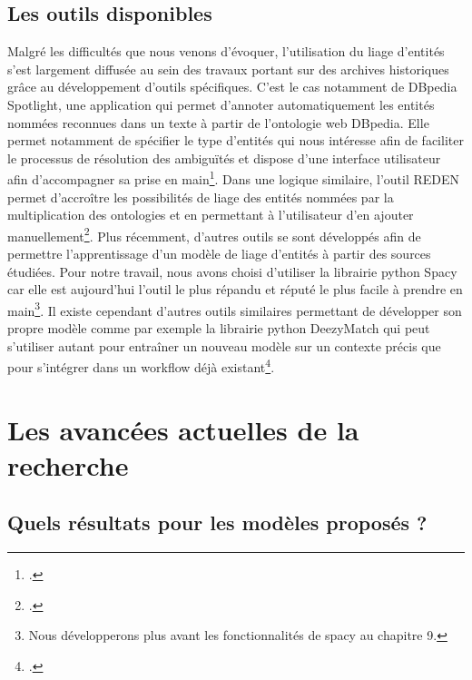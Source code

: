 \documentclass[a4paper,12pt,twoside]{book}
\begin{document}
	\subsection{Les outils disponibles}
	
	Malgré les difficultés que nous venons d'évoquer, l'utilisation du liage d'entités s'est largement diffusée au sein des travaux portant sur des archives historiques grâce au développement d'outils spécifiques. C'est le cas notamment de DBpedia Spotlight, une application qui permet d'annoter automatiquement les entités nommées reconnues dans un texte à partir de l'ontologie web DBpedia. Elle permet notamment de spécifier le type d'entités qui nous intéresse afin de faciliter le processus de résolution des ambiguïtés et dispose d'une interface utilisateur afin d'accompagner sa prise en main\footcite{mendes_dbpedia_2011}. Dans une logique similaire, l'outil REDEN permet d'accroître les possibilités de liage des entités nommées par la multiplication des ontologies et en permettant à l'utilisateur d'en ajouter manuellement\footcite{frontini_domain-adapted_2015}. Plus récemment, d'autres outils se sont développés afin de permettre l'apprentissage d'un modèle de liage d'entités à partir des sources étudiées. Pour notre travail, nous avons choisi d'utiliser la librairie python Spacy car elle est aujourd'hui l'outil le plus répandu et réputé le plus facile à prendre en main\footnote{Nous développerons plus avant les fonctionnalités de spacy au chapitre 9.}. Il existe cependant d'autres outils similaires permettant de développer son propre modèle comme par exemple la librairie python DeezyMatch qui peut s'utiliser autant pour entraîner un nouveau modèle sur un contexte précis que pour s'intégrer dans un workflow déjà existant\footcite{hosseini_deezymatch_2020}.
	
	\section{Les avancées actuelles de la recherche}
	
	\subsection{Quels résultats pour les modèles proposés ?}
	
\end{document}
